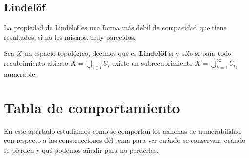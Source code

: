 \subsection{Lindelöf}%
\label{sub:lindelof}
La propiedad de Lindelöf es una forma más débil de compacidad que tiene resultados, si no los mismos, muy parecidos.

\begin{defi}[Lindelöf]
Sea $X$ un espacio topológico, decimos que es \textbf{Lindelöf} si y sólo si para todo recubrimiento abierto $X = \bigcup_{i \in I} U_i$ existe un subrecubrimiento $X = \bigcup_{k=1}^{\infty} U_{i_k}$ numerable.
\end{defi}

\section{Tabla de comportamiento}%
\label{sec:tabla_de_comportamiento_num}
En este apartado estudiamos como se comportan los axiomas de numerabilidad con respecto a las construcciones del tema  para ver cuándo se conservan, cuándo se pierden y qué podemos añadir para no perderlas.


